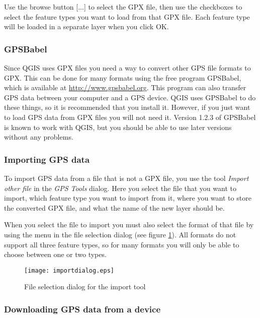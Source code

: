 Use the browse button {[}...{]} to select the GPX file, then use the
checkboxes to select the feature types you want to load from that
GPX file. Each feature type will be loaded in a separate layer when
you click OK.

\subsubsection{GPSBabel}

Since QGIS uses GPX files you need a way to convert other GPS file
formats to GPX. This can be done for many formats using the free program
GPSBabel, which is available at \url{http://www.gpsbabel.org}. This
program can also transfer GPS data between your computer and a GPS
device. QGIS uses GPSBabel to do these things, so it is recommended
that you install it. However, if you just want to load GPS data from
GPX files you will not need it. Version 1.2.3 of GPSBabel is known
to work with QGIS, but you should be able to use later versions without
any problems.


\subsubsection{Importing GPS data}

To import GPS data from a file that is not a GPX file, you use the
tool \emph{Import other file} in the \emph{GPS Tools} dialog. Here
you select the file that you want to import, which feature type you
want to import from it, where you want to store the converted GPX
file, and what the name of the new layer should be.

When you select the file to import you must also select the format
of that file by using the menu in the file selection dialog (see figure
\ref{figure importdialog}). All formats do not support all three
feature types, so for many formats you will only be able to choose
between one or two types.

\begin{figure}[ht]
   \begin{center}
\caption{\label{figure importdialog}File selection dialog for the import
tool}
\texttt{[image: importdialog.eps]}
   \end{center}
\end{figure}

\subsubsection{Downloading GPS data from a device}

